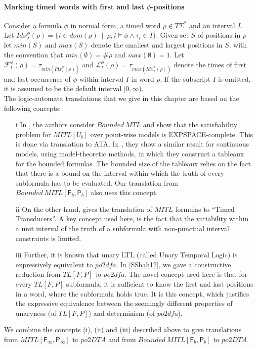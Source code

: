 \documentclass{llncs}
\newcommand{\fut}{\textsf{F}}
\newcommand{\past}{\textsf{P}}
\newcommand{\POTDFA}{\mbox{$\mathit{po2dfa}$}}
\newcommand{\bmitlfp}{\mbox{$\mathit{Bounded ~MITL[\fut_b,\past_b]}$}}
\newcommand{\potdta}{\mbox{$\mathit{po2DTA}$}}
\newcommand{\potdfa}{\POTDFA}
\newcommand{\utl}{\mbox{$\mathit{TL[F,P]}$}}
\newcommand{\mitlfpinf}{\mbox{$\mathit{MITL[\fut_\infty,\past_\infty]}$}}
\newcommand{\mitlfpb}{\bmitlfp}
\newcommand{\mitl}{\mbox{$\mathit{MITL}$}}
\newcommand{\idx}{\mathit{Idx}}
\newcommand{\frst}{{\mathcal F}}
\newcommand{\lst}{{\mathcal L}}
\begin{document}
\paragraph{Marking timed words with first and last $\phi$-positions\\}
Consider a formula $\phi$ in normal form, a timed word $\rho\in T\Sigma^*$ and an interval $I$. Let  $\idx^\phi_I(\rho) = \{ i \in dom(\rho) ~\mid~ \rho,i \models \phi \land \tau_i \in I\}$. Given set $S$ of positions in $\rho$ let $min(S)$ and $max(S)$ denote the smallest and largest positions in $S$, with the convention that
$min(\emptyset) =\#\rho$ and $max(\emptyset)=1$. Let $\frst^\phi_I(\rho) =
\tau_{min(\idx^\phi_I(\rho))}$ and   $\lst^\phi_I(\rho) =\tau_{max(\idx^\phi_I(\rho))}$ denote 
the times of first and last occurrence of $\phi$ within interval $I$ in word $\rho$.
If the subscript $I$ is omitted, it is assumed to be the default interval $[0,\infty)$.\\

The logic-automata translations that we give in this chapter are based on the following concepts:
\begin{itemize}
\item[i] In \cite{BMOW07}, the authors consider $\mathit{Bounded ~MTL}$ and show that the satisfiability problem for $\mathit{MITL[U_b]}$ over point-wise models is EXPSPACE-complete. This is done via translation to ATA. In \cite{BMOW08}, they show a similar result for continuous models, using model-theoretic methods, in which they construct a tableaux for the bounded formulas. The bounded size of the tableaux relies on the fact that there is a bound on the interval within which the truth of every subformula has to be evaluated. Our translation from \mitlfpb\/ also uses this concept.
\item[ii] On the other hand, \cite{MNP06} gives the translation of \mitl\/ formulas to ``Timed Transducers''. A key concept used here, is the fact that the variability within a unit interval of the truth of a subformula with non-punctual interval constraints is limited. 
\item[iii] Further, it is known that unary LTL (called Unary Temporal Logic) is expressively equivalent to \potdfa. In \ref{SShah12}, we gave a constructive reduction from \utl\/ to \potdfa. The novel concept used here is that for every \utl\/ subformula, it is sufficient to know the first and last positions in a word, where the subformula holds true. It is this concept, which justifies the expressive equivalence between the seemingly different properties of unaryness (of \utl) and determinism (of \potdfa). 
\end{itemize}
We combine the concepts (i), (ii) and (iii) described above to give translations from \mitlfpinf\/ to \potdta\/ and from \mitlfpb\/ to \potdta\/.
\end{document}
